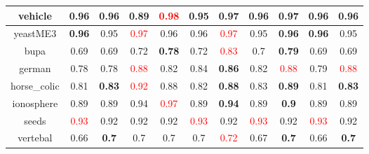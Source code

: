 \documentclass{article}%
\begin{document}
\begin{tabular}{c|cccccccccc}
vehicle&0.96&0.96&0.89&\textcolor{red}{ 
0.98
}&0.95&\textbf{0.97}&0.96&\textbf{0.97}&0.96&0.96\\%
\hline%
yeastME3&\textbf{0.96}&0.95&\textcolor{red}{ 
0.97
}&0.96&0.96&\textcolor{red}{ 
0.97
}&0.95&\textbf{0.96}&\textbf{0.96}&0.95\\%
\hline%
bupa&0.69&0.69&0.72&\textbf{0.78}&0.72&\textcolor{red}{ 
0.83
}&0.7&\textbf{0.79}&0.69&0.69\\%
\hline%
german&0.78&0.78&\textcolor{red}{ 
0.88
}&0.82&0.84&\textbf{0.86}&0.82&\textcolor{red}{ 
0.88
}&0.79&\textcolor{red}{ 
0.88
}\\%
\hline%
horse\_colic&0.81&\textbf{0.83}&\textcolor{red}{ 
0.92
}&0.88&0.82&\textbf{0.88}&0.83&\textbf{0.89}&0.81&\textbf{0.83}\\%
\hline%
ionosphere&0.89&0.89&0.94&\textcolor{red}{ 
0.97
}&0.89&\textbf{0.94}&0.89&\textbf{0.9}&0.89&0.89\\%
\hline%
seeds&\textcolor{red}{ 
0.93
}&0.92&0.92&0.92&\textcolor{red}{ 
0.93
}&0.92&\textcolor{red}{ 
0.93
}&0.92&\textcolor{red}{ 
0.93
}&0.92\\%
\hline%
vertebal&0.66&\textbf{0.7}&0.7&0.7&0.7&\textcolor{red}{ 
0.72
}&0.67&\textbf{0.7}&0.66&\textbf{0.7}\\%
\hline%
\end{tabular}

%
\end{document}
